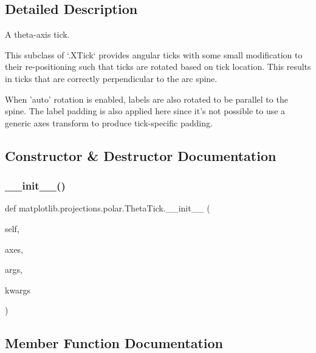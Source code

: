 \subsection{Detailed Description}
\begin{DoxyVerb}A theta-axis tick.

This subclass of `.XTick` provides angular ticks with some small
modification to their re-positioning such that ticks are rotated based on
tick location. This results in ticks that are correctly perpendicular to
the arc spine.

When 'auto' rotation is enabled, labels are also rotated to be parallel to
the spine. The label padding is also applied here since it's not possible
to use a generic axes transform to produce tick-specific padding.
\end{DoxyVerb}
 

\subsection{Constructor \& Destructor Documentation}
\mbox{\label{classmatplotlib_1_1projections_1_1polar_1_1ThetaTick_ac6a6b6282acf55443d8e755c021b3afc}} 
\subsubsection{\texorpdfstring{\+\_\+\+\_\+init\+\_\+\+\_\+()}{\_\_init\_\_()}}
{\footnotesize\ttfamily def matplotlib.\+projections.\+polar.\+Theta\+Tick.\+\_\+\+\_\+init\+\_\+\+\_\+ (\begin{DoxyParamCaption}\item[{}]{self,  }\item[{}]{axes,  }\item[{}]{args,  }\item[{}]{kwargs }\end{DoxyParamCaption})}



\subsection{Member Function Documentation}
\mbox{\label{classmatplotlib_1_1projections_1_1polar_1_1ThetaTick_af3d06bbaeacf0a5c6e14b3acdae3934f}} 
